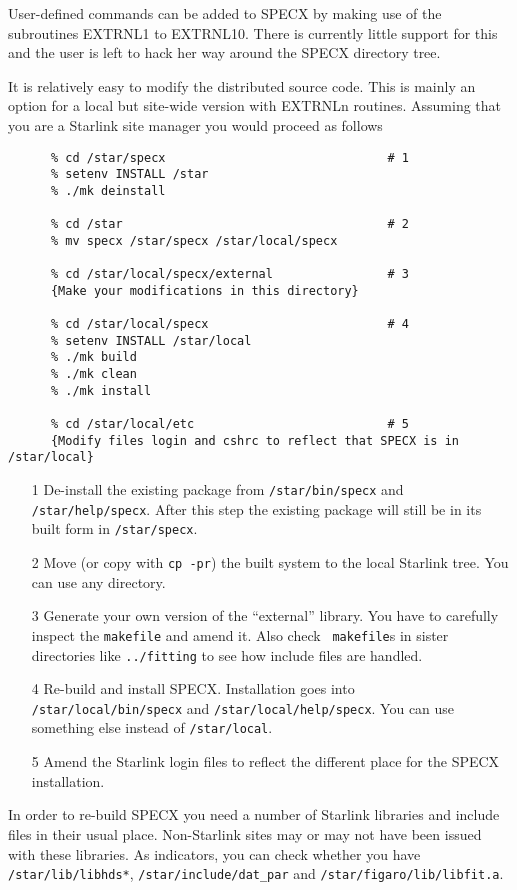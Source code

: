 User-defined commands can be added to SPECX by making use of the
subroutines EXTRNL1 to EXTRNL10. There is currently little support for
this and the user is left to hack her way around the SPECX directory
tree.

It is relatively easy to modify the distributed source code. This is
mainly an option for a local but site-wide version with EXTRNLn
routines. Assuming that you are a Starlink site manager you would
proceed as follows
\begin{verbatim}
      % cd /star/specx                               # 1
      % setenv INSTALL /star
      % ./mk deinstall

      % cd /star                                     # 2
      % mv specx /star/specx /star/local/specx

      % cd /star/local/specx/external                # 3
      {Make your modifications in this directory}

      % cd /star/local/specx                         # 4
      % setenv INSTALL /star/local
      % ./mk build
      % ./mk clean
      % ./mk install

      % cd /star/local/etc                           # 5
      {Modify files login and cshrc to reflect that SPECX is in /star/local}
\end{verbatim}
\begin{itemize}
\item[1] De-install the existing package from {\tt /star/bin/specx} and
   {\tt /star/help/specx}. After this step the existing package will
   still be in its built form in {\tt /star/specx}.
\item[2] Move (or copy with {\tt cp -pr}) the built system to the local
   Starlink tree. You can use any directory.
\item[3] Generate your own version of the ``external'' library. You have
   to carefully inspect the {\tt makefile} and amend it. Also check {\tt
   makefile}s in sister directories like {\tt ../fitting} to see how
   include files are handled.
\item[4] Re-build and install SPECX. Installation goes into {\tt
   /star/local/bin/specx} and {\tt /star/\-local/help/specx}. You can use
   something else instead of {\tt /star/local}.
\item[5] Amend the Starlink login files to reflect the different place
   for the SPECX installation.
\end{itemize}
In order to re-build SPECX you need a number of Starlink libraries and
include files in their usual place. Non-Starlink sites may or may not
have been issued with these libraries. As indicators, you can check
whether you have {\tt /star/lib/libhds*}, {\tt /star/include/dat\_par}
and {\tt /star/figaro/lib/libfit.a}.


